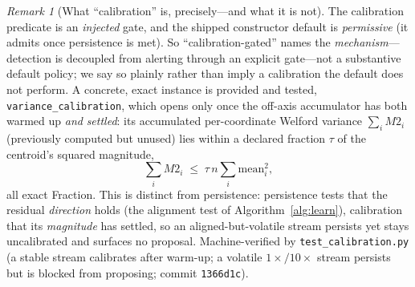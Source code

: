 \documentclass[11pt]{article}
\theoremstyle{plain}
\theoremstyle{definition}
\theoremstyle{remark}
\newtheorem{remark}[theorem]{Remark}
\begin{document}
\begin{remark}[What ``calibration'' is, precisely---and what it is not]\label{rem:calibration}
The calibration predicate is an \emph{injected} gate, and the shipped constructor default is \emph{permissive}
(it admits once persistence is met). So ``calibration-gated'' names the \emph{mechanism}---detection is
decoupled from alerting through an explicit gate---not a substantive default policy; we say so plainly rather
than imply a calibration the default does not perform. A concrete, exact instance is provided and tested,
\texttt{variance\_calibration}, which opens only once the off-axis accumulator has both warmed up \emph{and}
\emph{settled}: its accumulated per-coordinate Welford variance $\sum_i M2_i$ (previously computed but unused)
lies within a declared fraction $\tau$ of the centroid's squared magnitude,
\begin{equation}\label{eq:calib}
  \textstyle\sum_i M2_i \;\le\; \tau\,n\sum_i \mathrm{mean}_i^2 ,
\end{equation}
all exact Fraction. This is distinct from persistence: persistence tests that the residual \emph{direction}
holds (the alignment test of Algorithm~\ref{alg:learn}), calibration that its \emph{magnitude} has settled, so
an aligned-but-volatile stream persists yet stays uncalibrated and surfaces no proposal. Machine-verified by
\texttt{test\_calibration.py} (a stable stream calibrates after warm-up; a volatile $1{\times}/10{\times}$
stream persists but is blocked from proposing; commit \texttt{1366d1c}).
\end{remark}
\end{document}
